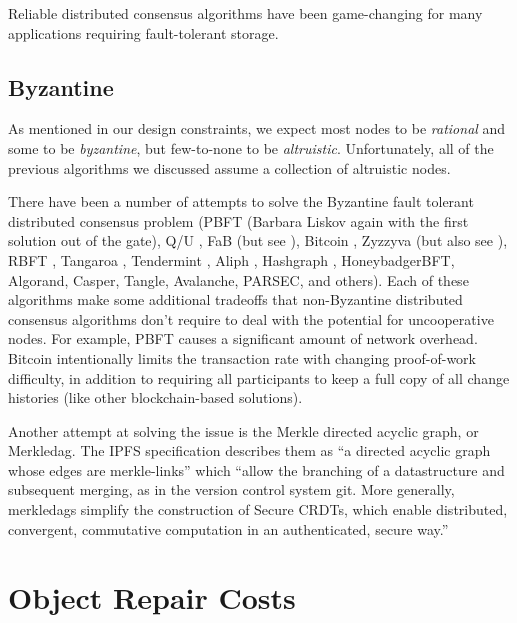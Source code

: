 \documentclass[11pt,fleqn,openany]{book}
\begin{document}
Reliable distributed consensus algorithms have been game-changing for many
applications requiring fault-tolerant storage.

\section{Byzantine}

As mentioned in our design constraints, we expect most nodes to be {\em
rational} and some to be {\em byzantine}, but few-to-none to be {\em
altruistic}. Unfortunately, all of the previous algorithms we discussed assume a
collection of altruistic nodes.

There have been a number of attempts to solve the Byzantine fault tolerant
distributed consensus problem
(PBFT \cite{pbft} (Barbara Liskov again with the
first solution out of the gate), Q/U \cite{qu}, FaB \cite{fab} (but see
\cite{fab-revisited}), Bitcoin \cite{bitcoin}, Zyzzyva \cite{zyzzyva} (but also
see \cite{fab-revisited}), RBFT \cite{rbft}, Tangaroa \cite{tangaroa},
Tendermint \cite{tendermint}, Aliph \cite{aliph}, Hashgraph \cite{hashgraph},
HoneybadgerBFT\cite{honeybadger}, Algorand\cite{algorand}, Casper\cite{casper},
Tangle\cite{tangle}, Avalanche\cite{avalanche}, PARSEC\cite{parsec}, and
others\cite{mickens-bft}).
Each of these algorithms make some
additional tradeoffs that non-Byzantine distributed consensus algorithms don't
require to deal with the potential for uncooperative nodes. For example,
PBFT \cite{pbft} causes a significant amount of network overhead. Bitcoin
\cite{bitcoin} intentionally limits the transaction rate with changing
proof-of-work difficulty, in addition to requiring all participants to keep a
full copy of all change histories (like other blockchain-based
solutions).

Another attempt at solving the issue is the Merkle directed acyclic graph, or
Merkledag. The IPFS specification describes them as ``a directed acyclic graph whose edges are merkle-links'' which ``allow the branching of a datastructure and subsequent merging, as in the version control system git. More generally, merkledags simplify the construction of Secure CRDTs, which enable distributed, convergent, commutative computation in an authenticated, secure way.'' \cite{ipfs-merkledag}

\chapter{Object Repair Costs}
\end{document}
